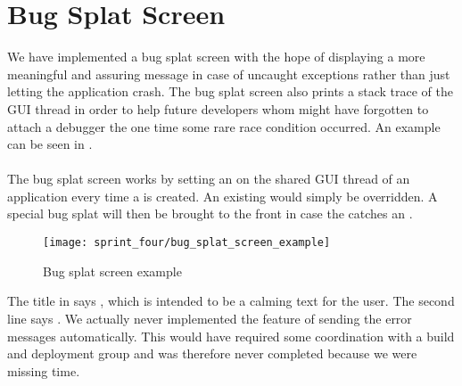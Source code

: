 
\section{Bug Splat Screen}
\label{sec:bug_splat_screen}

We have implemented a bug splat screen with the hope of displaying a more meaningful and assuring message in case of uncaught exceptions rather than just letting the application crash. The bug splat screen also prints a stack trace of the GUI thread in order to help future developers whom might have forgotten to attach a debugger the one time some rare race condition occurred. An example can be seen in .
\\\\
The bug splat screen works by setting an  on the shared GUI thread of an application every time a  is created. An existing  would simply be overridden. A special bug splat  will then be brought to the front in case the  catches an .

\begin{figure}[!htbp]
        \centering
        \texttt{[image: sprint\_four/bug\_splat\_screen\_example]}
        \caption{Bug splat screen example}
        \label{fig:bug_splat_screen_example}
\end{figure}
  
The title in  says , which is intended to be a calming text for the user. The second line says . We actually never implemented the feature of sending the error messages automatically. This would have required some coordination with a build and deployment group and was therefore never completed because we were missing time.   

